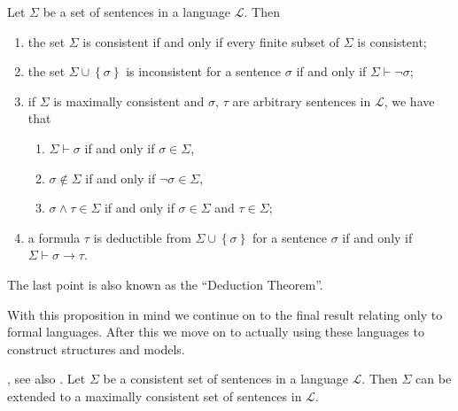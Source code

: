 \documentclass[../../main.tex]{subfiles}
\begin{document}
\begin{proposition}\label{consistency-prop}\cite[Proposition 1.3.10]{Cha90}
    Let $\Sigma$ be a set of sentences in a language $\mathcal{L}$. Then
    \begin{enumerate}
        \item the set $\Sigma$ is consistent if and only if every finite subset of $\Sigma$ is consistent;
        \item the set $\Sigma \cup \left\{\sigma\right\}$ is inconsistent for a sentence $\sigma$ if and only if $\Sigma \vdash \lnot \sigma$;
        \item if $\Sigma$ is maximally consistent and $\sigma,\, \tau$ are arbitrary sentences in $\mathcal{L}$, we have that
        \begin{enumerate}[label=(\roman*)]
            \item $\Sigma \vdash \sigma$ if and only if $\sigma \in \Sigma$,
            \item $\sigma \not\in \Sigma$ if and only if $\lnot \sigma \in \Sigma$,
            \item $\sigma \wedge \tau \in \Sigma$ if and only if $\sigma \in \Sigma$ and $\tau \in \Sigma$;
        \end{enumerate}
        \item a formula $\tau$ is deductible from $\Sigma \cup \left\{\sigma\right\}$ for a sentence $\sigma$ if and only if $\Sigma \vdash \sigma \rightarrow \tau$.
    \end{enumerate}

    The last point is also known as the ``Deduction Theorem''.
\end{proposition}

With this proposition in mind we continue on to the final result relating only to formal languages.
After this we move on to actually using these languages to construct structures and models.

\begin{theorem}\label{lindenbaums-theorem}\cite[Lemma 1.2.9]{Cha90}, see also \cite[Proposition 1.3.11]{Cha90}.
    Let $\Sigma$ be a consistent set of sentences in a language $\mathcal{L}$.
    Then $\Sigma$ can be extended to a maximally consistent set of sentences in $\mathcal{L}$.
\end{theorem}
\end{document}
